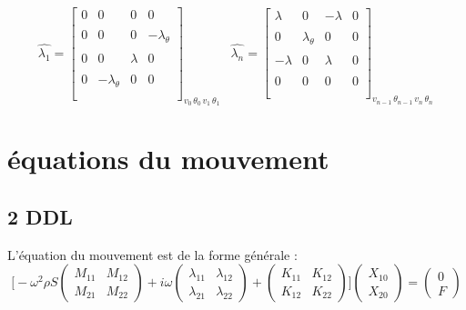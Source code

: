\documentclass[a4paper,10pt]{report} %
\begin{document}
\[ \widehat{\lambda_1}=\left[ \begin{array}{cccc}
0 &0& 0&0     \\\\
0&0&0&-\lambda_{\theta} \\\\
0&0& \lambda&0    \\\\
0&-\lambda_{\theta}&0&0   \\\\
 \end{array} \right]_{v_0 \, \theta_0 \, v_1 \, \theta_1 \, }
 \,\,\,\,
 \widehat{\lambda_n}=\left[ \begin{array}{cccc}
\lambda &0& -\lambda&0     \\\\
0&\lambda_{\theta}&0&0 \\\\
-\lambda&0&\lambda&0    \\\\
0&0&0&0   \\\\
 \end{array} \right]_{v_{n-1} \, \theta_{n-1} \, v_{n} \, \theta_{n} \, }\]
 





\section{équations du mouvement}
\subsection{2 DDL}
L'équation du mouvement est de la forme générale :
$$ \Bigg[
- \omega^2 \rho S \begin{pmatrix}
   M_{11} & M_{12} \\
   M_{21} & M_{22} 
\end{pmatrix}
+ i \omega \begin{pmatrix}
	\lambda_{11} & \lambda_{12} \\
	\lambda_{21} & \lambda_{22}
\end{pmatrix}
+ \begin{pmatrix}
	K_{11} & K_{12} \\
	K_{12} & K_{22}
\end{pmatrix} \Bigg]
\begin{pmatrix}
	X_{10} \\
	X_{20}
\end{pmatrix}
= \begin{pmatrix}
	0 \\
	F
\end{pmatrix}
$$
\end{document}
